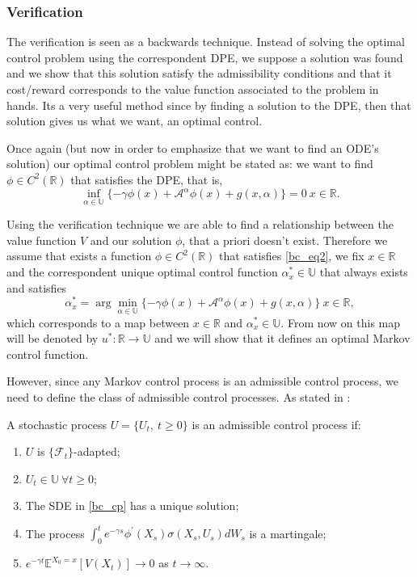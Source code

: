 \subsubsection{Verification}
 
The verification is seen as a backwards technique. Instead of solving the optimal control problem using the correspondent DPE, we suppose a solution was found and we show that this solution satisfy the admissibility conditions and that it cost/reward corresponds to the value function associated to the problem in hands. Its a very useful method since by finding a solution to the DPE, then that solution gives us what we want, an optimal control.


Once again (but now in order to emphasize that we want to find an ODE's solution) our optimal control problem might be stated as: we want to find  $\phi \in C^2(\mathds{R})$ that satisfies the DPE, that is,
\begin{equation}
  \inf_{\alpha \in \mathds{U}} \{  - \gamma \phi(x)+\mathcal{A^\alpha}\phi(x)+g(x,\alpha) \}=0 \ x\in \mathds{R}.
  \label{bc_eq2}
\end{equation}

Using the verification technique we are able to find a relationship between the value function $V$ and our solution $\phi$, that a priori doesn't exist.
Therefore we assume that exists a function $\phi \in C^2(\mathds{R})$ that satisfies \eqref{bc_eq2}, we fix $x \in \mathds{R}$ and the correspondent unique optimal control function $\alpha_x^* \in \mathds{U}$ that always exists and satisfies
\begin{equation}
 \alpha_x^*= \arg \min_{\alpha \in \mathds{U} }  \{  - \gamma \phi(x)+\mathcal{A^\alpha}\phi(x)+g(x,\alpha) \}  \ x\in \mathds{R},
 \label{bc_a}
\end{equation}
which corresponds to a map between $x \in \mathds{R}$ and $\alpha_x^* \in \mathds{U}$. From now on this map will be denoted by $u^*: \mathds{R} \rightarrow \mathds{U}$ and we will show that it defines an optimal Markov control function.

However, since any Markov control process is an admissible control process, we need to define the class of admissible control processes. As stated in \cite{ross}:
\begin{defi}
	\label{ac}
	A stochastic process $U= \{ U_t, \ t \geq 0 \}$ is an admissible control process if:
	\begin{enumerate}
		\item $U$ is $\{ \mathcal{F}_t\}$-adapted;
		\item $U_t \in \mathds{U} \ \forall t \geq 0$;
		\item The SDE in \eqref{bc_cp} has a unique solution;
		\item The process $\int^t_0 e^{-\gamma s} \phi^\prime(X_s)\sigma(X_s,U_s) dW_s$ is a martingale;
		\item $e^{-\gamma t} \mathds{E}^{X_0=x}[V(X_t)] \rightarrow 0$ as $t \rightarrow \infty$. 
	\end{enumerate}
\end{defi}

